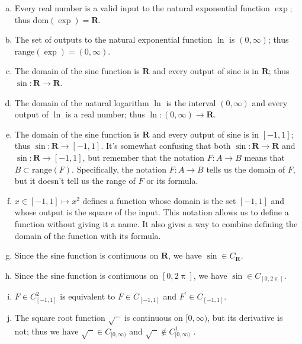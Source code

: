 \documentclass[12pt]{article}
\newenvironment{alphalist}{
  \begin{enumerate}[(a)]
    \addtolength{\itemsep}{-0.5\itemsep}}
  {\end{enumerate}}
\newcommand{\dom}{\mathrm{dom}}
\newcommand{\range}{\mathrm{range}}
\newcommand{\reals}{\mathbf{R}}
\begin{document}
\begin{alphalist}
\item Every real number is a valid input to the natural exponential function \(\exp\); thus \(\dom(\exp) = \reals\).

\item The set of outputs to the  natural exponential function $\ln$ is \((0,\infty) \); thus \(\range(\exp) = (0,\infty)\).

\item The domain of the sine function is $\reals$ and every output of sine is in $\reals$; thus $\sin : \reals \to \reals$.

\item The domain of the natural logarithm $\ln$ is the interval $(0,\infty)$ and every output of \(\ln\) is a real number; thus
$\ln : (0,\infty) \to \reals$.

\item The domain of the sine function is $\reals$ and every output of sine is in $[-1,1]$; thus $\sin : \reals \to [-1,1]$.
It's somewhat confusing that both $\sin : \reals \to \reals$ and $\sin : \reals \to [-1,1]$, but remember that the notation
$F : A \to B$ means that $B \subset \range(F)$. Specifically,
the notation $F : A \to B$ tells us the domain of $F$, but it doesn't 
tell us the range of $F$ or its formula.


\item $x \in [-1,1] \mapsto x^2$ defines a function whose domain is the set $[-1,1]$ and whose output is the square of
the input. This notation allows us to define a function without giving 
it a name. It also gives a way to combine defining the domain of the function 
with its formula.

\item Since the sine function is continuous on \(\reals\), we have $\sin \in C_\reals$.


\item Since the sine function is continuous on \([0,2 \uppi]\), we have \(\sin \in C_{[0,2 \uppi]}\).

\item $F \in C_{[-1,1]}^2$ is equivalent to  $F \in C_{[-1,1]}$ and $F^\prime \in C_{[-1,1]}$.

\item The square root function \(\sqrt{\phantom{x}}\) is continuous on \([0,\infty)\), but its derivative is not; thus we have
\(\sqrt{\phantom{x}} \in C_{[0,\infty)} \) and  \(\sqrt{\phantom{x}} \notin C_{[0,\infty)}^1 \) .
\end{alphalist}
\end{document}
